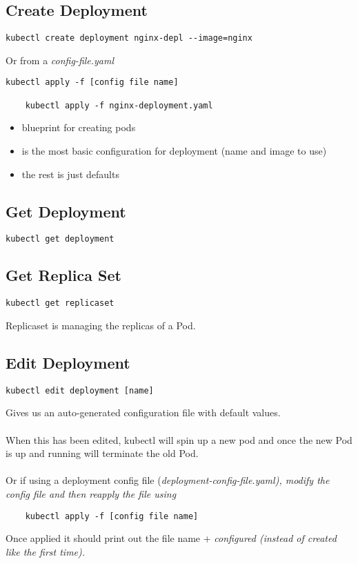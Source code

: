 \subsection{Create Deployment}\label{subsec:create-deployment}
\begin{lstlisting}[label={lst:lstlisting9}]
    kubectl create deployment nginx-depl --image=nginx
\end{lstlisting}
Or from a \it{config-file.yaml}
\begin{lstlisting}[label={lst:lstlisting16}]
    kubectl apply -f [config file name]

    kubectl apply -f nginx-deployment.yaml
\end{lstlisting}
\begin{itemize}
    \item blueprint for creating pods
    \item is the most basic configuration for deployment (name and image to use)
    \item the rest is just defaults
\end{itemize}

\subsection{Get Deployment}\label{subsec:get-deployment}
\begin{lstlisting}[label={lst:lstlisting10}]
    kubectl get deployment
\end{lstlisting}

\subsection{Get Replica Set}\label{subsec:get-replica-set}
\begin{lstlisting}[label={lst:lstlisting11}]
    kubectl get replicaset
\end{lstlisting}
Replicaset is managing the replicas of a Pod.

\subsection{Edit Deployment}\label{subsec:edit-deployment}
\begin{lstlisting}[label={lst:lstlisting12}]
    kubectl edit deployment [name]
\end{lstlisting}
Gives us an auto-generated configuration file with default values.
\\\\
When this has been edited, kubectl will spin up a new pod and once the new Pod is up and running will terminate the old Pod.
\\\\
Or if using a deployment config file (\it{deployment-config-file.yaml}), modify the config file and then reapply the file using
\begin{lstlisting}
    kubectl apply -f [config file name]
\end{lstlisting}
Once applied it should print out the file name + \it{configured} (instead of \it{created} like the first time).

